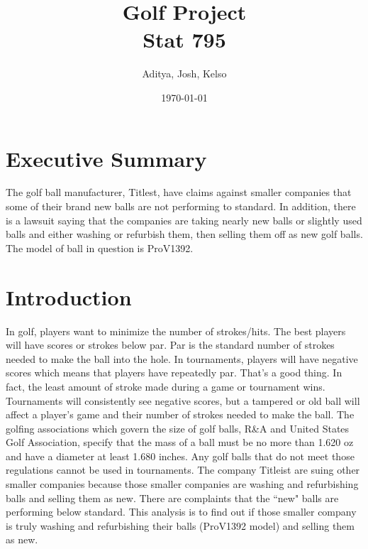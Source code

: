 \documentclass{article}\usepackage[]{graphicx}\usepackage[]{color}
\title{Golf Project \\
\large Stat 795}
\author{Aditya, Josh, Kelso}
\date{\today}
\makeatletter
\newenvironment{kframe}{%
 \def\at@end@of@kframe{}%
 \ifinner\ifhmode%
  \def\at@end@of@kframe{\end{minipage}}%
  \begin{minipage}{\columnwidth}%
 \fi\fi%
 \def\FrameCommand##1{\hskip\@totalleftmargin \hskip-\fboxsep
 \colorbox{shadecolor}{##1}\hskip-\fboxsep
     \hskip-\linewidth \hskip-\@totalleftmargin \hskip\columnwidth}%
 \MakeFramed {\advance\hsize-\width
   \@totalleftmargin\z@ \linewidth\hsize
   \@setminipage}}%
 {\par\unskip\endMakeFramed%
 \at@end@of@kframe}
\newenvironment{knitrout}{}{} %
\newcommand{\doublespacing}{\let\CS=\@currsize\renewcommand{
		\baselinestretch}{1.2}\small\CS}
\makeatother
\begin{document}
 
\maketitle



\begin{knitrout}
\color{fgcolor}\begin{kframe}


{\ttfamily\noindent\itshape\color{messagecolor}{\#\# Loading required package: bitops}}\end{kframe}
\end{knitrout}
\doublespacing


\section*{Executive Summary}


The golf ball manufacturer, Titlest, have claims against smaller companies that some of their brand new balls are not performing to standard. In addition, there is a lawsuit saying that the companies are taking nearly new balls or slightly used balls and either washing or refurbish them, then selling them off as new golf balls. The model of ball in question is ProV1392. 

\section*{Introduction}

In golf, players want to minimize the number of strokes/hits. The best players will have scores or strokes below par. Par is the standard number of strokes needed to make the ball into the hole. In tournaments, players will have negative scores which means that players have repeatedly par. That’s a good thing. In fact, the least amount of stroke made during a game or tournament wins. Tournaments will consistently see negative scores, but a tampered or old ball will affect a player’s game and their number of strokes needed to make the ball.   
The golfing associations which govern the size of golf balls, R\&A and United States Golf Association, specify that the mass of a ball must be no more than 1.620 oz and have a diameter at least 1.680 inches. Any golf balls that do not meet those regulations cannot be used in tournaments. The company Titleist are suing other smaller companies because those smaller companies are washing and refurbishing balls and selling them as new. There are complaints that the ``new" balls are performing below standard. This analysis is to find out if those smaller company is truly washing and refurbishing their balls (ProV1392 model) and selling them as new. 
\end{document}
